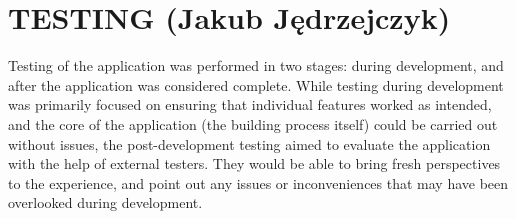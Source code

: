 \chapter{TESTING (Jakub Jędrzejczyk)}
\label{chap:Testing}

Testing of the application was performed in two stages: during development, and after the application was considered complete.
While testing during development was primarily focused on ensuring that individual features worked as intended, and the core of the application (the building process itself) could be carried out without issues, the post-development testing aimed to evaluate the application with the help of external testers.
They would be able to bring fresh perspectives to the experience, and point out any issues or inconveniences that may have been overlooked during development.



